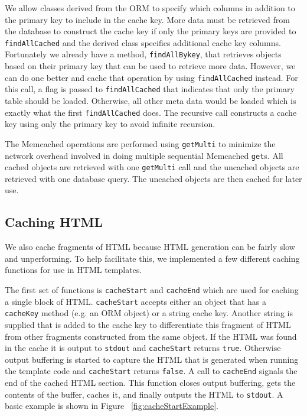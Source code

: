 \documentclass[12pt]{ucthesis}
\begin{document}
We allow classes derived from the ORM to specify which columns in addition to the primary key to include in the cache key.
More data must be retrieved from the database to construct the cache key if only the primary keys are provided to {\tt findAllCached} and the derived class specifies additional cache key columns.
Fortunately we already have a method, {\tt findAllBykey}, that retrieves objects based on their primary key that can be used to retrieve more data.
However, we can do one better and cache that operation by using {\tt findAllCached} instead.
For this call, a flag is passed to {\tt findAllCached} that indicates that only the primary table should be loaded.
Otherwise, all other meta data would be loaded which is exactly what the first {\tt findAllCached} does.
The recursive call constructs a cache key using only the primary key to avoid infinite recursion.

The \textsf{Memcached} operations are performed using {\tt getMulti} to minimize the network overhead involved in doing multiple sequential \textsf{Memcached} {\tt get}s.
All cached objects are retrieved with one {\tt getMulti} call and the uncached objects are retrieved with one database query.
The uncached objects are then cached for later use.

\subsection{Caching HTML}
We also cache fragments of HTML because HTML generation can be fairly slow and unperforming.
To help facilitate this, we implemented a few different caching functions for use in HTML templates.

The first set of functions is {\tt cacheStart} and {\tt cacheEnd} which are used for caching a single block of HTML.
{\tt cacheStart} accepts either an object that has a {\tt cacheKey} method (e.g. an ORM object) or a string cache key.
Another string is supplied that is added to the cache key to differentiate this fragment of HTML from other fragments constructed from the same object.
If the HTML was found in the cache it is output to {\tt stdout} and {\tt cacheStart} returns {\tt true}.
Otherwise output buffering is started to capture the HTML that is generated when running the template code and {\tt cacheStart} returns {\tt false}.
A call to {\tt cacheEnd} signals the end of the cached HTML section.
This function closes output buffering, gets the contents of the buffer, caches it, and finally outputs the HTML to {\tt stdout}.
A basic example is shown in Figure ~\ref{fig:cacheStartExample}.
\end{document}
